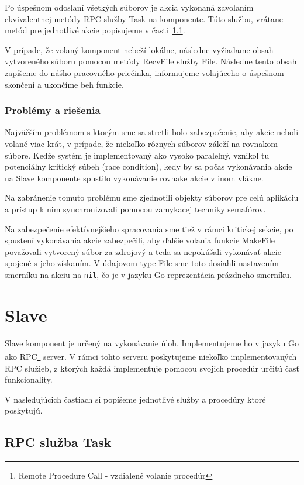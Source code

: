 Po úspešnom odoslaní všetkých súborov je akcia vykonaná zavolaním ekvivalentnej metódy
RPC služby Task na komponente. Túto službu, vrátane metód pre jednotlivé akcie popisujeme
v časti~\ref{sec:slave:rpc:task}.

V prípade, že volaný komponent nebeží lokálne, následne vyžiadame obsah vytvoreného
súboru pomocou metódy RecvFile služby File. Následne tento obsah zapíšeme do nášho
pracovného priečinka, informujeme volajúceho o úspešnom skončení a ukončíme beh funkcie.

\subsubsection{Problémy a riešenia}

Najväčším problémom s ktorým sme sa stretli bolo zabezpečenie, aby akcie neboli
volané viac krát, v prípade, že niekoľko rôznych súborov záleží na rovnakom
súbore. Kedže systém je implementovaný ako vysoko paralelný, vznikol tu potenciálny
kritický súbeh (race condition), kedy by sa počas vykonávania akcie na Slave komponente
spustilo vykonávanie rovnake akcie v inom vlákne.

Na zabránenie tomuto problému sme zjednotili objekty súborov pre celú aplikáciu a prístup
k nim synchronizovali pomocou zamykacej techniky semafórov.

Na zabezpečenie efektívnejšieho spracovania sme tiež v rámci kritickej sekcie, po spustení
vykonávania akcie zabezpečili, aby ďalšie volania funkcie MakeFile považovali vytvorený
súbor za zdrojový a teda sa nepokúšali vykonávať akcie spojené s jeho získaním. V údajovom
type File sme toto dosiahli nastavením smerníku na akciu na \texttt{nil}, čo je v jazyku
Go reprezentácia prázdneho smerníku.

\section{Slave}
\label{sec:slave}

Slave komponent je určený na vykonávanie úloh. Implementujeme ho v jazyku Go
ako RPC\footnote{Remote Procedure Call - vzdialené volanie procedúr} server.
V rámci tohto serveru poskytujeme niekoľko implementovaných RPC služieb,
z ktorých každá implementuje pomocou svojich procedúr určitú časť funkcionality.

V nasledujúcich častiach si popíšeme jednotlivé služby a procedúry ktoré
poskytujú.

\subsection{RPC služba Task}
    \label{sec:slave:rpc:task}

